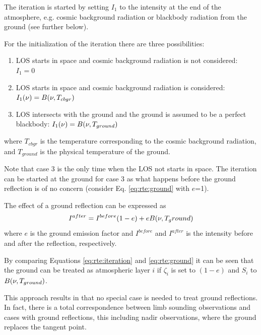  The iteration is started by setting $I_1$ to the intensity at the end
 of the atmosphere, e.g. cosmic background radiation
 or blackbody radiation from the ground (see further below).

 
 For the initialization of the iteration there are three possibilities:
    
 \begin{enumerate}
      \item LOS starts in space and cosmic background radiation is not
            considered: $I_1=0$
      \item LOS starts in space and cosmic background radiation is 
            considered: $I_1(\nu)=B(\nu,T_{cbgr})$
      \item LOS intersects with the ground and the ground is assumed to 
            be a perfect blackbody: $I_1(\nu)=B(\nu,T_{ground})$
 \end{enumerate}
 where $T_{cbgr}$ is the temperature corresponding to the cosmic
 background radiation, and $T_{ground}$ is the physical temperature of
 the ground.
 
 Note that case 3 is the only time when the LOS not starts in space.  The
 iteration can be started at the ground for case 3 as what happens
 before the ground reflection is of no concern (consider Eq.
 \ref{eq:rte:ground} with $e$=1).


  \label{sec:rte:ground}

 The effect of a ground reflection can be expressed as
 \begin{equation}
   I^{after} = I^{before}(1-e) + eB(\nu,T_ground)
  \label{eq:rte:ground}
 \end{equation} 
 where $e$ is the ground emission factor and $I^{before}$ and
 $I^{after}$ is the intensity before and after the reflection,
 respectively. 

 By comparing Equations \ref{eq:rte:iteration} and \ref{eq:rte:ground}
 it can be seen that the ground can be treated as atmospheric
 layer $i$ if $\zeta_i$ is set to $(1-e)$ and $S_i$ to $B(\nu,T_{ground})$.
 
 This approach results in that no special case is needed to treat
 ground reflections. In fact, there is a total correspondence between
 limb sounding observations and cases with ground reflections, this
 including nadir observations, where the ground replaces the tangent
 point.



 \label{sec:rte:trans}
  
